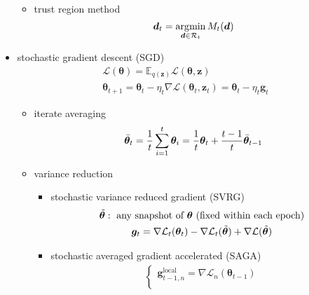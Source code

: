 \begin{itemize}
\begin{itemize}
\begin{itemize}
\begin{gather}
            \end{gather}
        \end{itemize}
        \item trust region method 
        \begin{gather}
            \bm{d}_t=\operatorname*{\arg\!min}_{\bm{d}\in\mathcal{R}_t}M_t(\bm{d})
        \end{gather}
    \end{itemize}
    \item stochastic gradient descent (SGD)
    \begin{gather}
        \mathcal{L}(\bm{\theta})=\mathbb{E}_{q(\bm{z})}\mathcal{L}(\bm{\theta},\bm{z})\\
        \bm{\theta}_{t+1}=\bm{\theta}_t-\eta_t\nabla\mathcal{L}(\bm{\theta}_t,\bm{z}_t)=\bm{\theta}_t-\eta_t\bm{g}_t
    \end{gather}
    \begin{itemize}
        \item iterate averaging 
        \begin{gather}
            \Bar{\bm{\theta}}_t=\frac{1}{t}\sum_{i=1}^t\bm{\theta}_i=\frac{1}{t}\bm{\theta}_t+\frac{t-1}{t}\Bar{\bm{\theta}}_{t-1}
        \end{gather}
        \item variance reduction
        \begin{itemize}
            \item stochastic variance reduced gradient (SVRG)
            \begin{gather}
                \Tilde{\bm{\theta}}:~\text{any snapshot of}~\bm{\theta}~\text{(fixed within each epoch)}\\
                \bm{g}_t=\nabla\mathcal{L}_t(\bm{\theta}_t)-\nabla\mathcal{L}_t(\Tilde{\bm{\theta}})+\nabla\mathcal{L}(\Tilde{\bm{\theta}})
            \end{gather}
            \item stochastic averaged gradient accelerated (SAGA)
            \begin{gather}
            \begin{cases}
                \bm{g}_{t-1,n}^\text{local}=\nabla\mathcal{L}_n(\bm{\theta}_{t-1})\\

\end{cases}
\end{gather}
\end{itemize}
\end{itemize}
\end{itemize}

